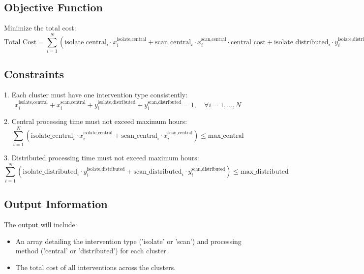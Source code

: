 \documentclass{article}
\begin{document}
\subsection*{Objective Function}
Minimize the total cost:
\[
\text{Total Cost} = \sum_{i=1}^{N} \left( \text{isolate\_central}_{i} \cdot x_{i}^{\text{isolate,central}} + \text{scan\_central}_{i} \cdot x_{i}^{\text{scan,central}} \cdot \text{central\_cost} + \text{isolate\_distributed}_{i} \cdot y_{i}^{\text{isolate,distributed}} + \text{scan\_distributed}_{i} \cdot y_{i}^{\text{scan,distributed}} \cdot \text{distributed\_cost} \right)
\]

\subsection*{Constraints}

1. Each cluster must have one intervention type consistently:
\[
x_{i}^{\text{isolate,central}} + x_{i}^{\text{scan,central}} + y_{i}^{\text{isolate,distributed}} + y_{i}^{\text{scan,distributed}} = 1, \quad \forall i = 1, \ldots, N
\]

2. Central processing time must not exceed maximum hours:
\[
\sum_{i=1}^{N} \left( \text{isolate\_central}_{i} \cdot x_{i}^{\text{isolate,central}} + \text{scan\_central}_{i} \cdot x_{i}^{\text{scan,central}} \right) \leq \text{max\_central}
\]

3. Distributed processing time must not exceed maximum hours:
\[
\sum_{i=1}^{N} \left( \text{isolate\_distributed}_{i} \cdot y_{i}^{\text{isolate,distributed}} + \text{scan\_distributed}_{i} \cdot y_{i}^{\text{scan,distributed}} \right) \leq \text{max\_distributed}
\]

\subsection*{Output Information}
The output will include:
\begin{itemize}
    \item An array detailing the intervention type ('isolate' or 'scan') and processing method ('central' or 'distributed') for each cluster.
    \item The total cost of all interventions across the clusters.
\end{itemize}
\end{document}
